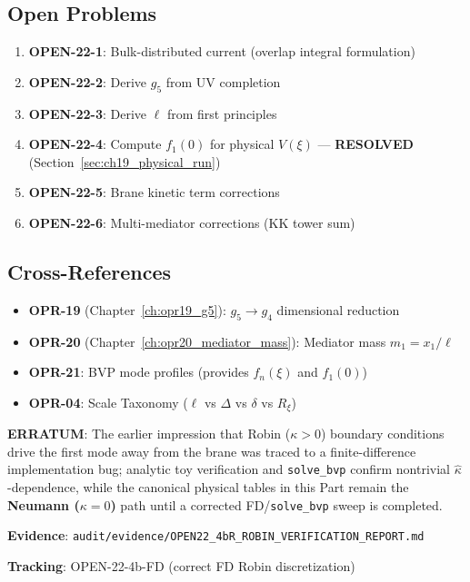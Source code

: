 \subsection{Open Problems}

\begin{enumerate}
    \item \textbf{OPEN-22-1}: Bulk-distributed current (overlap integral formulation)
    \item \textbf{OPEN-22-2}: Derive $g_5$ from UV completion
    \item \textbf{OPEN-22-3}: Derive $\ell$ from first principles
    \item \textbf{OPEN-22-4}: Compute $f_1(0)$ for physical $V(\xi)$
          --- \textbf{RESOLVED} (Section~\ref{sec:ch19_physical_run})
    \item \textbf{OPEN-22-5}: Brane kinetic term corrections
    \item \textbf{OPEN-22-6}: Multi-mediator corrections (KK tower sum)
\end{enumerate}

\subsection{Cross-References}

\begin{itemize}
    \item \textbf{OPR-19} (Chapter~\ref{ch:opr19_g5}): $g_5 \to g_4$ dimensional reduction
    \item \textbf{OPR-20} (Chapter~\ref{ch:opr20_mediator_mass}): Mediator mass $m_1 = x_1/\ell$
    \item \textbf{OPR-21}: BVP mode profiles (provides $f_n(\xi)$ and $f_1(0)$)
    \item \textbf{OPR-04}: Scale Taxonomy ($\ell$ vs $\Delta$ vs $\delta$ vs $R_\xi$)
\end{itemize}

\begin{tcolorbox}[colback=red!5!white, colframe=red!75!black,
    title={\textbf{Canonical Interpretation: Robin BC Status (OPEN-22-4b.2)}}]
\textbf{ERRATUM}: The earlier impression that Robin ($\kappa > 0$) boundary conditions
drive the first mode away from the brane was traced to a finite-difference
implementation bug; analytic toy verification and \texttt{solve\_bvp} confirm
nontrivial $\hat{\kappa}$-dependence, while the canonical physical tables in this
Part remain the \textbf{Neumann ($\kappa = 0$)} path until a corrected FD/\texttt{solve\_bvp}
sweep is completed.

\medskip
\textbf{Evidence}: \texttt{audit/evidence/OPEN22\_4bR\_ROBIN\_VERIFICATION\_REPORT.md}

\textbf{Tracking}: OPEN-22-4b-FD (correct FD Robin discretization)
\end{tcolorbox}

